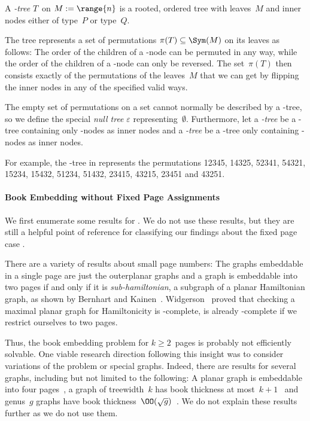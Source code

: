\begin{definition}\label{def:pq}
A \emph{\PQ-tree} $T$~on $M := \range{n}$ is a rooted, ordered
tree with leaves~$M$ and inner nodes either of type~$P$ 
or type~$Q$.

The tree represents a set of permutations $\pi(T) \subseteq \Sym(M)$ on its leaves as follows: The order of the children
of a \PT-node can be permuted in any way, while the order of the children of a \Q-node can only be reversed. The set~$\pi(T)$ then consists exactly of the permutations of the leaves~$M$ that we can get
by flipping the inner nodes in any of the specified valid ways.

The empty set of permutations on a set cannot normally be described by a \PQ-tree, so we define the	 special \emph{null tree} $\varepsilon$ representing~$\emptyset$.
Furthermore, let a \emph{\PT-tree} be a \PQ-tree containing only \PT-nodes as inner nodes and a \emph{\Q-tree} be a 
\PQ-tree only containing \Q-nodes as inner nodes.
\end{definition}

For example, the \PQ-tree in  represents the permutations 12345, 14325, 52341, 54321, 15234,  15432,  51234,  51432, 23415, 43215, 23451 and 43251.

\paragraph{Book Embedding without Fixed Page Assignments}

We first enumerate some results for \probBookNormal. We do not use
these results, but they are still a helpful point of reference for classifying our
findings about the fixed page case \probBook.

There are a variety of results about small page numbers: The graphs
embeddable in a single page are just the outerplanar graphs and a graph
is embeddable into two pages if and only if it is \emph{sub-hamiltonian}, \ie a subgraph of a planar Hamiltonian
graph, as shown by Bernhart and Kainen~\cite{Bernhart79}. Widgerson~\cite{Widgerson82} proved
that checking a maximal planar graph for Hamiltonicity is \NP-complete, \ie \probBookNormal is already
\NP-complete if we restrict ourselves to two pages.

Thus, the book embedding problem for $k \ge 2$~pages is probably not efficiently solvable.
One viable research direction following this insight was to consider variations of the problem
or special graphs. Indeed, there are results for several graphs, including
but not limited to the following: A planar graph is embeddable into four pages~\cite{Yannakakis86},
a graph of treewidth~$k$ has book thickness at most~$k + 1$~\cite{Dujmovic07} and genus~$g$
graphs have book thickness~$\OO(\sqrt{g})$~\cite{Malitz88}. We do not explain these results further as we do not use them.

